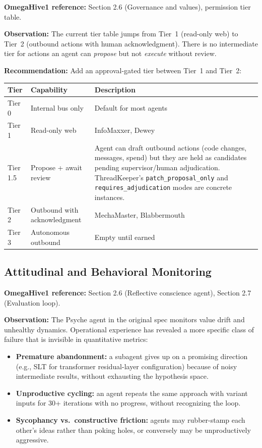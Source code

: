 \documentclass[11pt,a4paper]{article}
\begin{document}
\textbf{OmegaHive1 reference:} Section 2.6 (Governance and values), permission tier table.

\textbf{Observation:} The current tier table jumps from Tier~1 (read-only
web) to Tier~2 (outbound actions with human acknowledgment). There is no
intermediate tier for actions an agent can \emph{propose} but not
\emph{execute} without review.

\textbf{Recommendation:} Add an approval-gated tier between Tier~1 and
Tier~2:

\begin{center}
\begin{tabularx}{\textwidth}{llX}
\toprule
\textbf{Tier} & \textbf{Capability} & \textbf{Description} \\
\midrule
Tier 0 & Internal bus only & Default for most agents \\
Tier 1 & Read-only web & InfoMaxxer, Dewey \\
Tier 1.5 & Propose + await review & Agent can draft outbound actions
  (code changes, messages, spend) but they are held as candidates
  pending supervisor/human adjudication. ThreadKeeper's
  \texttt{patch\_proposal\_only} and \texttt{requires\_adjudication}
  modes are concrete instances. \\
Tier 2 & Outbound with acknowledgment & MechaMaster, Blabbermouth \\
Tier 3 & Autonomous outbound & Empty until earned \\
\bottomrule
\end{tabularx}
\end{center}

\subsection{Attitudinal and Behavioral Monitoring}
\label{sec:psyche}

\textbf{OmegaHive1 reference:} Section 2.6 (Reflective conscience agent), Section 2.7 (Evaluation loop).

\textbf{Observation:} The Psyche agent in the original spec monitors value
drift and unhealthy dynamics. Operational experience has revealed a more
specific class of failure that is invisible in quantitative metrics:

\begin{itemize}[nosep]
  \item \textbf{Premature abandonment:} a subagent gives up on a promising
    direction (e.g., SLT for transformer residual-layer configuration)
    because of noisy intermediate results, without exhausting the
    hypothesis space.
  \item \textbf{Unproductive cycling:} an agent repeats the same approach
    with variant inputs for 30+ iterations with no progress, without
    recognizing the loop.
  \item \textbf{Sycophancy vs.\ constructive friction:} agents may
    rubber-stamp each other's ideas rather than poking holes, or conversely
    may be unproductively aggressive.
\end{itemize}
\end{document}
